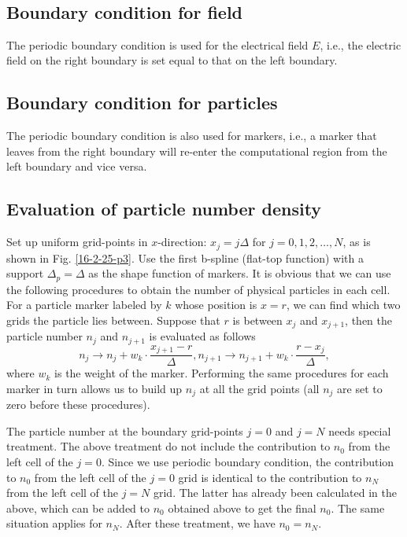 \documentclass{article}
\begin{document}
\

\subsection{Boundary condition for field}

The periodic boundary condition is used for the electrical field $E$, i.e.,
the electric field on the right boundary is set equal to that on the left
boundary.

\subsection{Boundary condition for particles}

The periodic boundary condition is also used for markers, i.e., a marker that
leaves from the right boundary will re-enter the computational region from the
left boundary and vice versa.

\subsection{Evaluation of particle number density}\label{10-12-e1}

Set up uniform grid-points in $x$-direction: $x_j = j \Delta$ for $j = 0, 1,
2, \ldots, N$, as is shown in Fig. \ref{16-2-25-p3}. Use the first b-spline
(flat-top function) with a support $\Delta_p = \Delta$ as the shape function
of markers. It is obvious that we can use the following procedures to obtain
the number of physical particles in each cell. For a particle marker labeled
by $k$ whose position is $x = r$, we can find which two grids the particle
lies between. Suppose that $r$ is between $x_j$ and $x_{j + 1}$, then the
particle number $n_j$ and $n_{j + 1}$ is evaluated as follows
\begin{equation}
  \label{10-13-1} n_j \rightarrow n_j + w_k \cdot \frac{x_{j + 1} -
  r}{\Delta}, n_{j + 1} \rightarrow n_{j + 1} + w_k \cdot \frac{r -
  x_j}{\Delta},
\end{equation}
where $w_k$ is the weight of the marker. Performing the same procedures for
each marker in turn allows us to build up $n_j$ at all the grid points (all
$n_j$ are set to zero before these procedures).

The particle number at the boundary grid-points $j = 0$ and $j = N$ needs
special treatment. The above treatment do not include the contribution to
$n_0$ from the left cell of the $j = 0$. Since we use periodic boundary
condition, the contribution to $n_0$ from the left cell of the $j = 0$ grid is
identical to the contribution to $n_N$ from the left cell of the $j = N$ grid.
The latter has already been calculated in the above, which can be added to
$n_0$ obtained above to get the final $n_0$. The same situation applies for
$n_N$. After these treatment, we have $n_0 = n_N$.
\end{document}
